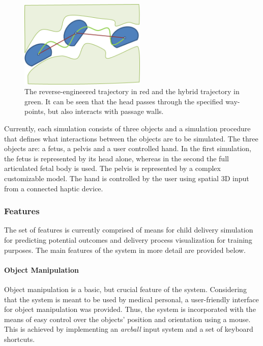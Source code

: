 \begin{figure}
  \centering
    \includegraphics[width=60mm]{sections/methodology/images/basic/hybrid-trajectory.png}
  \caption[The reverse-engineered trajectory in red and the hybrid trajectory in green.]{\label{hybridFig} The reverse-engineered trajectory in red and the hybrid trajectory in green. It can be seen that the head passes through the specified way-points, but also interacts with passage walls.}
\end{figure}

Currently, each simulation consists of three objects and a simulation procedure that defines what interactions between the objects are to be simulated. The three objects are: a fetus, a pelvis and a user controlled hand. In the first simulation, the fetus is represented by its head alone, whereas in the second the full articulated fetal body is used. The pelvis is represented by a complex customizable model. The hand is controlled by the user using spatial 3D input from a connected haptic device.

\subsubsection{Features}

The set of features is currently comprised of means for child delivery simulation for predicting potential outcomes and delivery process visualization for training purposes. The main features of the system in more detail are provided below.

\paragraph{Object Manipulation}
Object manipulation is a basic, but crucial feature of the system. Considering that the system is meant to be used by medical personal, a user-friendly interface for object manipulation was provided. Thus, the system is incorporated with the means of easy control over the objects' position and orientation using a mouse. This is achieved by implementing an \emph{arcball} input system and a set of keyboard shortcuts.

